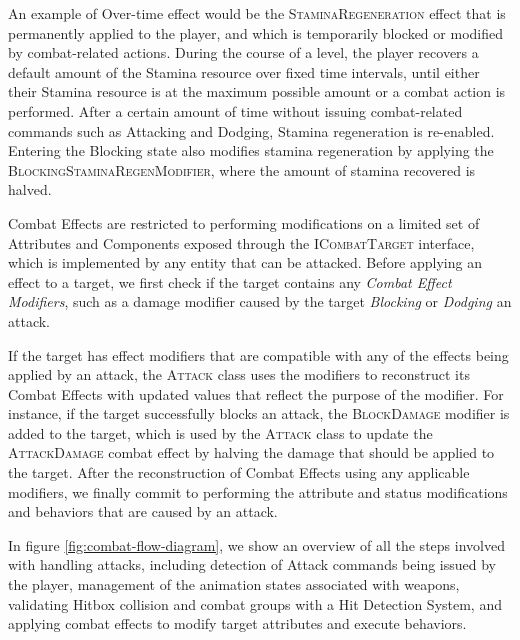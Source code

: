 An example of Over-time effect would be the \textsc{StaminaRegeneration} effect that is permanently applied to the player, and which is temporarily blocked or modified by combat-related actions. During the course of a level, the player recovers a default amount of the Stamina resource over fixed time intervals, until either their Stamina resource is at the maximum possible amount or a combat action is performed. After a certain amount of time without issuing combat-related commands such as Attacking and Dodging, Stamina regeneration is re-enabled. Entering the Blocking state also modifies stamina regeneration by applying the \textsc{BlockingStaminaRegenModifier}, where the amount of stamina recovered is halved.

Combat Effects are restricted to performing modifications on a limited set of Attributes and Components exposed through the \textsc{ICombatTarget} interface, which is implemented by any entity that can be attacked. Before applying an effect to a target, we first check if the target contains any \emph{Combat Effect Modifiers}, such as a damage modifier caused by the target \emph{Blocking} or \emph{Dodging} an attack.

If the target has effect modifiers that are compatible with any of the effects being applied by an attack, the \textsc{Attack} class uses the modifiers to reconstruct its Combat Effects with updated values that reflect the purpose of the modifier. For instance, if the target successfully blocks an attack, the \textsc{BlockDamage} modifier is added to the target, which is used by the \textsc{Attack} class to update the \textsc{AttackDamage} combat effect by halving the damage that should be applied to the target. After the reconstruction of Combat Effects using any applicable modifiers, we finally commit to performing the attribute and status modifications and behaviors that are caused by an attack.

In figure \ref{fig:combat-flow-diagram}, we show an overview of all the steps involved with handling attacks, including detection of Attack commands being issued by the player, management of the animation states associated with weapons, validating Hitbox collision and combat groups with a Hit Detection System, and applying combat effects to modify target attributes and execute behaviors.



